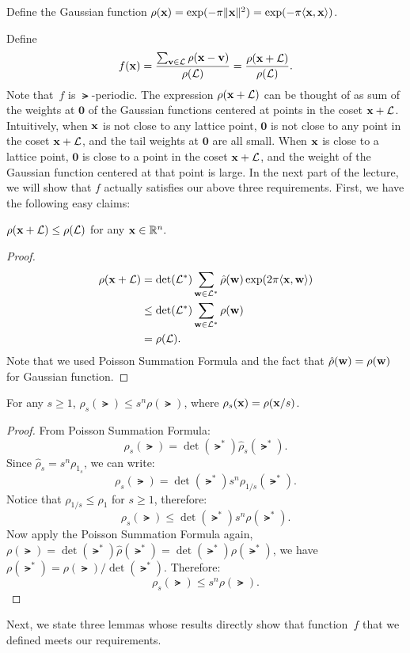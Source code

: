 \documentclass[11pt]{article}
\begin{document}
\begin{definition}
  Define the Gaussian function
  $\rho(\mathbf{x}) = \exp(-\pi \lVert\mathbf{x}\rVert^2) = \exp(-\pi
  \langle\mathbf{x},\mathbf{x}\rangle)$.
\end{definition}

\begin{definition}
  
\end{definition}
Define
\[ f(\mathbf{x}) = \frac{\sum_{\mathbf{v} \in
      \mathcal{L}}{\rho(\mathbf{x}-\mathbf{v})}}{\rho(\mathcal{L})} =
  \frac{\rho(\mathbf{x}+\mathcal{L})}{\rho(\mathcal{L})}. \] Note that~$f$ is
$\lat$-periodic. The expression $\rho(\mathbf{x}+\mathcal{L})$ can be thought of
as sum of the weights at $\mathbf{0}$ of the Gaussian functions
centered at points in the coset $\mathbf{x} + \mathcal{L}$. Intuitively, when
$\mathbf{x}$ is not close to any lattice point, $\mathbf{0}$ is not close
to any point in the coset $\mathbf{x} + \mathcal{L}$, and the tail weights at
$\mathbf{0}$ are all small. When $\mathbf{x}$ is close to a lattice point,
$\mathbf{0}$ is close to a point in the coset $\mathbf{x} + \mathcal{L}$, and the
weight of the Gaussian function centered at that point is large. In
the next part of the lecture, we will show that $f$ actually satisfies
our above three requirements. First, we have the following easy
claims:

\begin{claim}
  $\rho(\mathbf{x} + \mathcal{L}) \leq \rho(\mathcal{L})$ for any $\mathbf{x} \in \mathbb{R}^n.$
\end{claim}

\begin{proof}
  \begin{align*}
    \rho(\mathbf{x} + \mathcal{L})
    &= \det(\mathcal{L}^*) \sum_{\mathbf{w} \in \mathcal{L}^*} \hat{\rho}(\mathbf{w})\exp(2 \pi \langle\mathbf{x},\mathbf{w}\rangle ) \\
    &\leq   \det(\mathcal{L}^*)\sum_{\mathbf{w} \in \mathcal{L}^*} \rho(\mathbf{w}) \\
    &=  \rho(\mathcal{L}).
  \end{align*}
  Note that we used Poisson Summation Formula and the fact that
  $\hat{\rho}(\mathbf{w}) = \rho(\mathbf{w})$ for Gaussian function.
\end{proof}

\begin{claim}
  \label{claim2}
  For any $s \geq 1$, $\rho_s(\lat) \leq s^n \rho(\lat)$, where
  $\rho_s(\mathbf{x}) = \rho(\mathbf{x}/s)$.
\end{claim}

\begin{proof}
  From Poisson Summation Formula:
  \[\rho_s(\lat) = \det(\lat^*)\hat{\rho}_{s}(\lat^*).\]
  Since $\hat{\rho}_s = s^n \rho_{1_s}$, we can write:
  \[\rho_s(\lat) = \det(\lat^*)s^n\rho_{1/s}(\lat^*).\]
  Notice that $\rho_{1/s} \leq \rho_{1}$ for $s \geq 1$, therefore:
  \[\rho_s(\lat) \leq \det(\lat^*)s^n\rho(\lat^*).\]
  Now apply the Poisson Summation Formula again,
  $\rho(\lat) = \det(\lat^*)\hat{\rho}(\lat^*) =
  \det(\lat^*)\rho(\lat^*)$, we have
  $\rho(\lat^*) = \rho(\lat)/\det(\lat^*)$. Therefore:
  \[\rho_s(\lat) \leq s^n\rho(\lat).\]
\end{proof}
Next, we state three lemmas whose results directly show that
function~$f$ that we defined meets our requirements.
\end{document}
